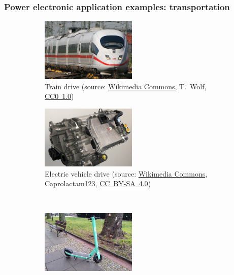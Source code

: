 \begin{frame}[c]
	\frametitle{Power electronic application examples: transportation}
	\begin{figure}
		\centering
		\begin{subfigure}[b]{0.49\textwidth}
			\centering
			\includegraphics[width=0.5\textwidth]{fig/lec01/ICE.jpg}
			\caption{Train drive (source: \href{hhttps://commons.wikimedia.org/wiki/File:DB_AG_406_001-8.jpg}{Wikimedia Commons}, T.~Wolf, \href{https://creativecommons.org/publicdomain/zero/1.0/}{CC0~1.0})}
		\end{subfigure}
		\hfill
		\begin{subfigure}[b]{0.49\textwidth}
			\centering
			\includegraphics[width=0.5\textwidth]{fig/lec01/Drive.jpg}
			\caption{Electric vehicle drive (source: \href{https://commons.wikimedia.org/wiki/File:Vitesco_Technologies_EMR3.jpg}{Wikimedia Commons}, Caprolactam123, \href{https://creativecommons.org/licenses/by-sa/4.0/deed.en}{CC~BY-SA~4.0})}
		\end{subfigure}
		\\
		\begin{subfigure}[b]{0.49\textwidth}
			\centering
			\includegraphics[width=0.5\textwidth]{fig/lec01/Scooter.jpg}

\end{subfigure}
\end{figure}
\end{frame}
